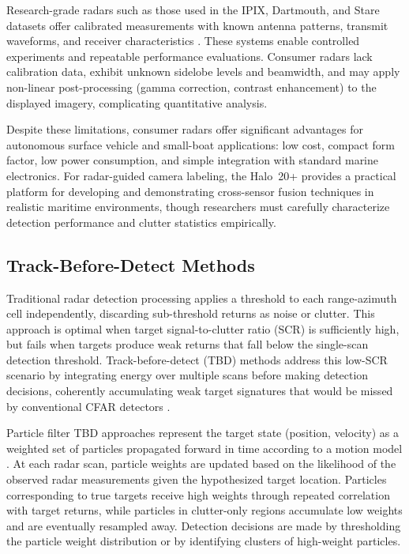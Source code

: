 Research-grade radars such as those used in the IPIX, Dartmouth, and Stare datasets offer calibrated measurements with known antenna patterns, transmit waveforms, and receiver characteristics \cite{Gangeskar2022}. These systems enable controlled experiments and repeatable performance evaluations. Consumer radars lack calibration data, exhibit unknown sidelobe levels and beamwidth, and may apply non-linear post-processing (gamma correction, contrast enhancement) to the displayed imagery, complicating quantitative analysis.

Despite these limitations, consumer radars offer significant advantages for autonomous surface vehicle and small-boat applications: low cost, compact form factor, low power consumption, and simple integration with standard marine electronics. For radar-guided camera labeling, the Halo~20+ provides a practical platform for developing and demonstrating cross-sensor fusion techniques in realistic maritime environments, though researchers must carefully characterize detection performance and clutter statistics empirically.

\subsection{Track-Before-Detect Methods}

Traditional radar detection processing applies a threshold to each range-azimuth cell independently, discarding sub-threshold returns as noise or clutter. This approach is optimal when target signal-to-clutter ratio (SCR) is sufficiently high, but fails when targets produce weak returns that fall below the single-scan detection threshold. Track-before-detect (TBD) methods address this low-SCR scenario by integrating energy over multiple scans before making detection decisions, coherently accumulating weak target signatures that would be missed by conventional CFAR detectors \cite{Blackman1999}.

Particle filter TBD approaches represent the target state (position, velocity) as a weighted set of particles propagated forward in time according to a motion model \cite{Sangston2012}. At each radar scan, particle weights are updated based on the likelihood of the observed radar measurements given the hypothesized target location. Particles corresponding to true targets receive high weights through repeated correlation with target returns, while particles in clutter-only regions accumulate low weights and are eventually resampled away. Detection decisions are made by thresholding the particle weight distribution or by identifying clusters of high-weight particles.

